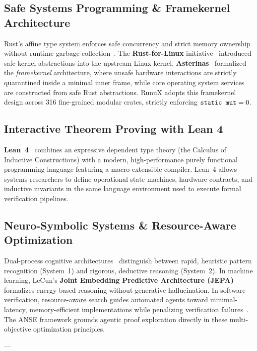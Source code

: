 \documentclass[10pt,twocolumn,letterpaper]{article}
\theoremstyle{definition}
\begin{document}
\subsection{Safe Systems Programming \& Framekernel Architecture}
Rust's affine type system enforces safe concurrency and strict memory ownership without runtime garbage collection~\citep{jung2017rustbelt}. The \textbf{Rust-for-Linux} initiative~\citep{ojeda2021rustforlinux} introduced safe kernel abstractions into the upstream Linux kernel. \textbf{Asterinas}~\citep{asterinas2023framekernel} formalized the \textit{framekernel} architecture, where unsafe hardware interactions are strictly quarantined inside a minimal inner frame, while core operating system services are constructed from safe Rust abstractions. RunuX adopts this framekernel design across 316 fine-grained modular crates, strictly enforcing $\text{\texttt{static mut}} = 0$.

\subsection{Interactive Theorem Proving with Lean 4}
\textbf{Lean~4}~\citep{demoura2021lean4} combines an expressive dependent type theory (the Calculus of Inductive Constructions) with a modern, high-performance purely functional programming language featuring a macro-extensible compiler. Lean~4 allows systems researchers to define operational state machines, hardware contracts, and inductive invariants in the same language environment used to execute formal verification pipelines.

\subsection{Neuro-Symbolic Systems \& Resource-Aware Optimization}
Dual-process cognitive architectures~\citep{kahneman2011thinking} distinguish between rapid, heuristic pattern recognition (System~1) and rigorous, deductive reasoning (System~2). In machine learning, LeCun's \textbf{Joint Embedding Predictive Architecture (JEPA)}~\citep{lecun2022path} formalizes energy-based reasoning without generative hallucination. In software verification, resource-aware search guides automated agents toward minimal-latency, memory-efficient implementations while penalizing verification failures~\citep{geminiteam2024gemini}. The ANSE framework grounds agentic proof exploration directly in these multi-objective optimization principles.

---
\end{document}
